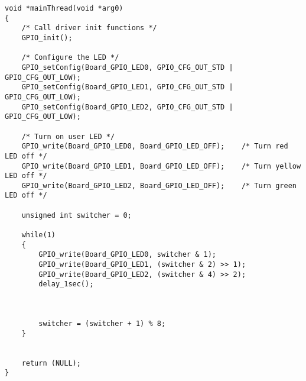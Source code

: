 \begin{lstlisting}[style=CStyle, caption={as}, captionpos=b, label={lst:label}, escapechar=@]
void *mainThread(void *arg0)
{
    /* Call driver init functions */
    GPIO_init();
 
    /* Configure the LED */
    GPIO_setConfig(Board_GPIO_LED0, GPIO_CFG_OUT_STD | GPIO_CFG_OUT_LOW);
    GPIO_setConfig(Board_GPIO_LED1, GPIO_CFG_OUT_STD | GPIO_CFG_OUT_LOW);
    GPIO_setConfig(Board_GPIO_LED2, GPIO_CFG_OUT_STD | GPIO_CFG_OUT_LOW);
 
    /* Turn on user LED */
    GPIO_write(Board_GPIO_LED0, Board_GPIO_LED_OFF);    /* Turn red LED off */
    GPIO_write(Board_GPIO_LED1, Board_GPIO_LED_OFF);    /* Turn yellow LED off */
    GPIO_write(Board_GPIO_LED2, Board_GPIO_LED_OFF);    /* Turn green LED off */
 
    unsigned int switcher = 0;
 
    while(1)
    {
        GPIO_write(Board_GPIO_LED0, switcher & 1);
        GPIO_write(Board_GPIO_LED1, (switcher & 2) >> 1);
        GPIO_write(Board_GPIO_LED2, (switcher & 4) >> 2);
        delay_1sec();
 
 
 
        switcher = (switcher + 1) % 8;
    }
 
 
    return (NULL);
}
\end{lstlisting}
